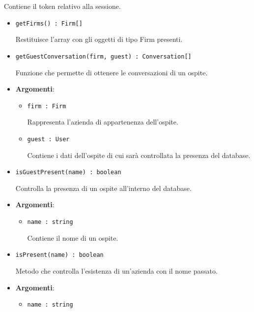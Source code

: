 \documentclass[../DefinizioneDiProdotto.tex]{subfiles}
\begin{document}
\begin{itemize}
\begin{itemize}
\begin{itemize}
\begin{itemize}
	 Contiene il token relativo alla sessione.
	\end{itemize}
	\end{itemize}\vspace{0.5em}
	\begin{itemize}
	\item \texttt{getFirms() : Firm[]}\

	 Restituisce l'array con gli oggetti di tipo Firm presenti.
	\end{itemize}\vspace{0.5em}
	\begin{itemize}
	\item \texttt{getGuestConversation(firm, guest) : Conversation[]}\

	 Funzione che permette di ottenere le conversazioni di un ospite.

	\item \textbf{Argomenti}:
	\begin{itemize}
	\item \texttt{firm : Firm}\

	 Rappresenta l'azienda di appartenenza dell'ospite.
	\item \texttt{guest : User}\

	 Contiene i dati dell'ospite di cui sarà controllata la presenza del database.
	\end{itemize}
	\end{itemize}\vspace{0.5em}
	\begin{itemize}
	\item \texttt{isGuestPresent(name) : boolean}\

	 Controlla la presenza di un ospite all'interno del database.

	\item \textbf{Argomenti}:
	\begin{itemize}
	\item \texttt{name : string}\

	 Contiene il nome di un ospite.
	\end{itemize}
	\end{itemize}\vspace{0.5em}
	\begin{itemize}
	\item \texttt{isPresent(name) : boolean}\

	 Metodo che controlla l'esistenza di un'azienda con il nome passato.

	\item \textbf{Argomenti}:
	\begin{itemize}
	\item \texttt{name : string}\


\end{itemize}
\end{itemize}
\end{itemize}
\end{itemize}
\end{document}
